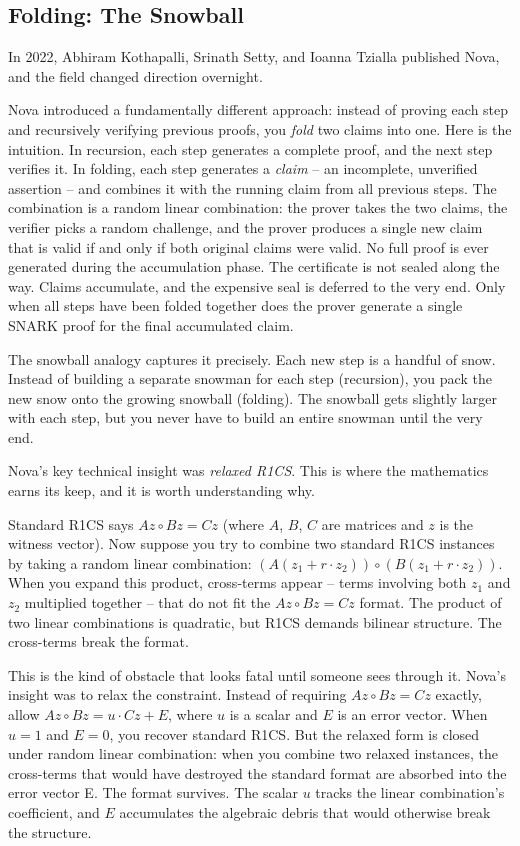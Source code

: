 \documentclass[
  11pt,
  openany]{report}
\begin{document}
\subsection{Folding: The Snowball}\label{folding-the-snowball}

In 2022, Abhiram Kothapalli, Srinath Setty, and Ioanna Tzialla published Nova,
and the field changed direction overnight.

Nova introduced a fundamentally different approach: instead of proving each step
and recursively verifying previous proofs, you \emph{fold} two claims into one.
Here is the intuition. In recursion, each step generates a complete proof, and
the next step verifies it. In folding, each step generates a \emph{claim} -- an
incomplete, unverified assertion -- and combines it with the running claim from
all previous steps. The combination is a random linear combination: the prover
takes the two claims, the verifier picks a random challenge, and the prover
produces a single new claim that is valid if and only if both original claims
were valid. No full proof is ever generated during the accumulation phase. The
certificate is not sealed along the way. Claims accumulate, and the expensive
seal is deferred to the very end. Only when all steps have been folded together
does the prover generate a single SNARK proof for the final accumulated claim.

The snowball analogy captures it precisely. Each new step is a handful of snow.
Instead of building a separate snowman for each step (recursion), you pack the
new snow onto the growing snowball (folding). The snowball gets slightly larger
with each step, but you never have to build an entire snowman until the very
end.

Nova's key technical insight was \emph{relaxed R1CS}. This is where the
mathematics earns its keep, and it is worth understanding why.

Standard R1CS says \(Az \circ Bz = Cz\) (where \(A\), \(B\), \(C\) are matrices
and \(z\) is the witness vector). Now suppose you try to combine two standard
R1CS instances by taking a random linear combination:
\((A(z_1 + r \cdot z_2)) \circ (B(z_1 + r \cdot z_2))\). When you expand this
product, cross-terms appear -- terms involving both \(z_1\) and \(z_2\)
multiplied together -- that do not fit the \(Az \circ Bz = Cz\) format. The
product of two linear combinations is quadratic, but R1CS demands bilinear
structure. The cross-terms break the format.

This is the kind of obstacle that looks fatal until someone sees through it.
Nova's insight was to relax the constraint. Instead of requiring
\(Az \circ Bz = Cz\) exactly, allow \(Az \circ Bz = u \cdot Cz + E\), where
\(u\) is a scalar and \(E\) is an error vector. When \(u = 1\) and \(E = 0\),
you recover standard R1CS. But the relaxed form is closed under random linear
combination: when you combine two relaxed instances, the cross-terms that would
have destroyed the standard format are absorbed into the error vector E. The
format survives. The scalar \(u\) tracks the linear combination's coefficient,
and \(E\) accumulates the algebraic debris that would otherwise break the
structure.
\end{document}
